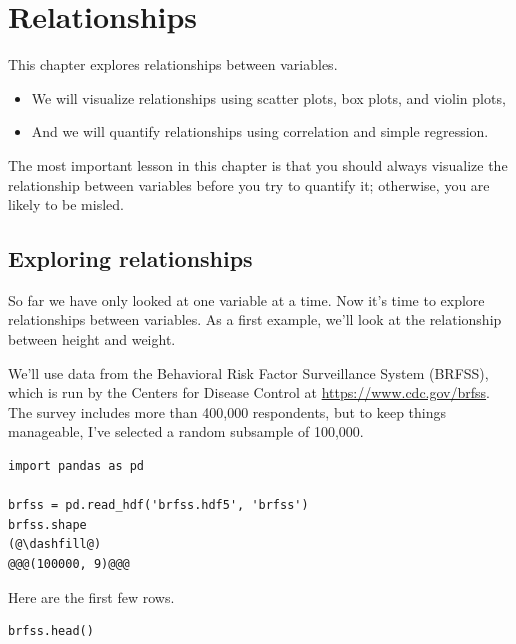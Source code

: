 \hypertarget{relationships}{%
\chapter{Relationships}\label{relationships}}

This chapter explores relationships between variables.

\begin{itemize}
\item
  We will visualize relationships using scatter plots, box plots, and
  violin plots,
\item
  And we will quantify relationships using correlation and simple
  regression.
\end{itemize}

The most important lesson in this chapter is that you should always
visualize the relationship between variables before you try to quantify
it; otherwise, you are likely to be misled.

\hypertarget{exploring-relationships}{%
\section{Exploring relationships}\label{exploring-relationships}}

So far we have only looked at one variable at a time. Now it's time to
explore relationships between variables. As a first example, we'll look
at the relationship between height and weight.

We'll use data from the Behavioral Risk Factor Surveillance System
(BRFSS), which is run by the Centers for Disease Control at
\url{https://www.cdc.gov/brfss}. The survey includes more than 400,000
respondents, but to keep things manageable, I've selected a random
subsample of 100,000.

\begin{lstlisting}[]
import pandas as pd

brfss = pd.read_hdf('brfss.hdf5', 'brfss')
brfss.shape
(@\dashfill@)
@@@(100000, 9)@@@
\end{lstlisting}

Here are the first few rows.

\begin{lstlisting}[]
brfss.head()
\end{lstlisting}

